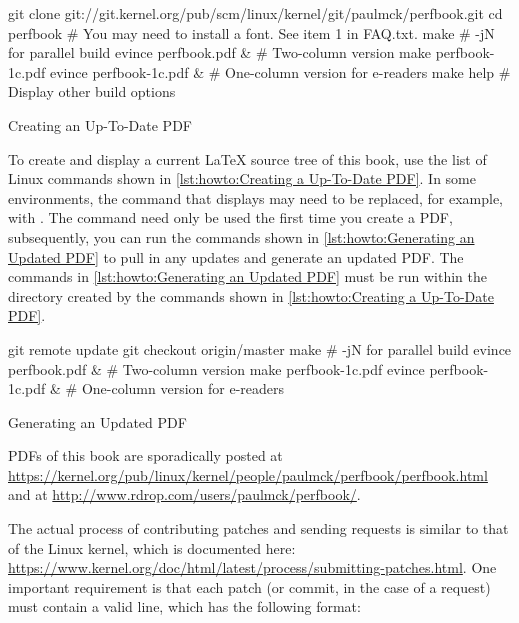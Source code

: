\begin{listing}
\begin{VerbatimL}[breaklines=true,breakafter=/,
        breakaftersymbolpre=\raisebox{-.7ex}{\textcolor{darkgray}{\Pisymbol{psy}{191}}},
	breaksymbolleft=\textcolor{darkgray}{\tiny\ensuremath{\hookrightarrow}},
        numbers=none,xleftmargin=0pt]
git clone git://git.kernel.org/pub/scm/linux/kernel/git/paulmck/perfbook.git
cd perfbook
# You may need to install a font. See item 1 in FAQ.txt.
make                     # -jN for parallel build
evince perfbook.pdf &    # Two-column version
make perfbook-1c.pdf
evince perfbook-1c.pdf & # One-column version for e-readers
make help                # Display other build options
\end{VerbatimL}
\caption{Creating an Up-To-Date PDF}
\label{lst:howto:Creating a Up-To-Date PDF}
\end{listing}

To create and display a current \LaTeX{} source tree of this book,
use the list of Linux commands shown in
\cref{lst:howto:Creating a Up-To-Date PDF}.
In some environments, the  command that displays 
may need to be replaced, for example, with .
The  command need only be used the first time you
create a PDF, subsequently, you can run the commands shown in
\cref{lst:howto:Generating an Updated PDF} to pull in any updates
and generate an updated PDF\@.
The commands in
\cref{lst:howto:Generating an Updated PDF}
must be run within the  directory created by the commands
shown in
\cref{lst:howto:Creating a Up-To-Date PDF}.

\begin{listing}
\begin{VerbatimL}[numbers=none,xleftmargin=0pt]
git remote update
git checkout origin/master
make                     # -jN for parallel build
evince perfbook.pdf &    # Two-column version
make perfbook-1c.pdf
evince perfbook-1c.pdf & # One-column version for e-readers
\end{VerbatimL}
\caption{Generating an Updated PDF}
\label{lst:howto:Generating an Updated PDF}
\end{listing}

PDFs of this book are sporadically posted at
\url{https://kernel.org/pub/linux/kernel/people/paulmck/perfbook/perfbook.html}
and at
\url{http://www.rdrop.com/users/paulmck/perfbook/}.

The actual process of contributing patches and sending 
requests is similar to that of the Linux kernel, which is documented
here:
\url{https://www.kernel.org/doc/html/latest/process/submitting-patches.html}.
One important requirement is that each patch (or commit, in the case
of a  request) must contain a valid  line,
which has the following format:

